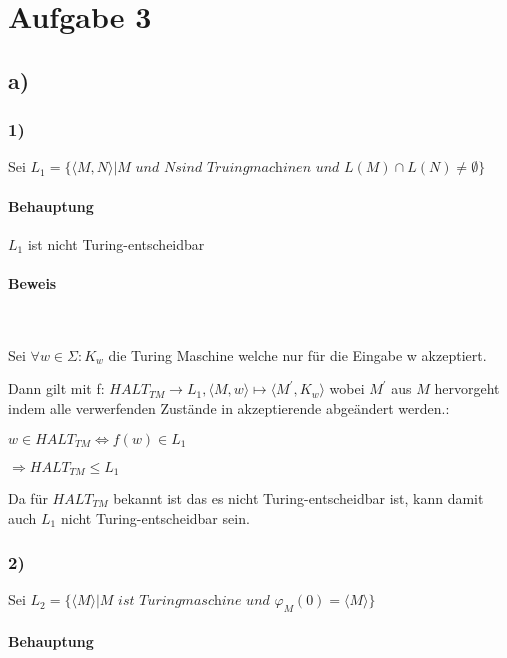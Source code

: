 \section*{Aufgabe 3}

\subsection*{a)}

\subsubsection*{1)}

Sei $L_1 = \{\langle M,N \rangle | M \textit{ und } N \textit{sind Truingmachinen und } L(M) \cap L(N) \neq \emptyset\}$

\paragraph*{Behauptung}

$L_1$ ist nicht Turing-entscheidbar

\paragraph*{Beweis}~

Sei $\forall w \in \Sigma: K_w$ die Turing Maschine welche nur für die Eingabe w akzeptiert.

Dann gilt mit f: $HALT_{TM}  \to L_1,  \langle M, w \rangle \mapsto \langle M^\prime, K_w \rangle$ wobei $M^\prime$ aus $M$ hervorgeht indem alle verwerfenden Zustände in akzeptierende abgeändert werden.:

$w \in HALT_{TM} \Leftrightarrow f(w) \in L_1$

$\Rightarrow HALT_{TM} \leq L_1$

Da für $HALT_{TM}$ bekannt ist das es nicht Turing-entscheidbar ist, kann damit auch $L_1$ nicht Turing-entscheidbar sein.

\subsubsection*{2)}

Sei $L_2 = \{ \langle M \rangle | M \textit{ ist Turingmaschine und }\varphi_M(0) = \langle M \rangle \}$

\paragraph*{Behauptung}

